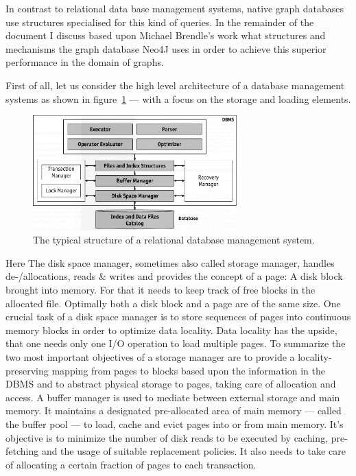 \documentclass[a4paper,10pt]{article}
\begin{document}
        In contrast to relational data base management systems, native graph data\-bases use structures specialised for this kind of queries.
        In the remainder of the document I discuss based upon Michael Brendle's work what structures and mechanisms the graph database Neo4J uses in order to achieve this superior performance in the domain of graphs.

        First of all, let us consider the high level architecture of a database management systems as shown in figure~\ref{dbms_arch} --- with a focus on the storage and loading elements.

        \begin{figure}[htp]\label{dbms_arch}
        \begin{center}
        \includegraphics[keepaspectratio,width=0.7\textwidth]{img/00_intro/RDBMS.png}
        \end{center}
        \caption{The typical structure of a relational database management system.} %
        \end{figure}

        Here The disk space manager, sometimes also called storage manager, handles de-/allocations, reads \& writes and provides the concept of a page: A disk block brought into memory. 
        For that it needs to keep track of free blocks in the allocated file. Optimally both a disk block and a page are of the same size. 
        One crucial task of a disk space manager is to store sequences of pages into continuous memory blocks in order to optimize data locality.
        Data locality has the upside, that one needs only one I/O operation to load multiple pages.
        To summarize the two most important objectives of a storage manager are to provide a locality-preserving mapping from pages to blocks based upon the information in the DBMS and to abstract physical storage to pages, taking care of allocation and access.
        A buffer manager is used to mediate between external storage and main memory. It maintains a designated pre-allocated area of main memory --- called the buffer pool --- to load, cache and evict pages into or from main memory.
        It's objective is to minimize the number of disk reads to be executed by caching, pre-fetching and the usage of suitable replacement policies. 
        It also needs to take care of allocating a certain fraction of pages to each transaction.
\end{document}
